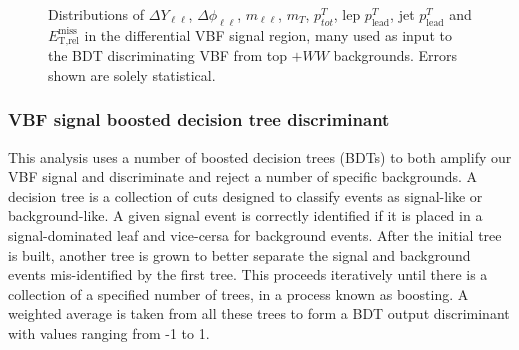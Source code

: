 \begin{figure}[!h]
{  }\hfill
  \hfill
{\caption{Distributions of $\Delta Y_{\ell\ell}$, $\Delta \phi_{\ell\ell}$, $m_{\ell\ell}$, $m_T$, $p^T_{tot}$, lep $p^T_{\text{lead}}$, jet $p^T_{\text{lead}}$ and $\ensuremath{E_{\text{T,rel}}^{\text{miss}}}$ in the differential VBF signal region, many used as input to the BDT discriminating VBF from top $+WW$ backgrounds. Errors shown are solely statistical.
\label{fig:signalregion}}}
\end{figure}

\subsubsection{VBF signal boosted decision tree discriminant}
This analysis uses a number of boosted decision trees (BDTs) to both amplify our VBF signal and discriminate and reject a number of specific backgrounds. A decision tree is a collection of cuts designed to classify events as signal-like or background-like. A given signal event is correctly identified if it is placed in a signal-dominated leaf and vice-cersa for background events. After the initial tree is built, another tree is grown to better separate the signal and background events mis-identified by the first tree. This proceeds iteratively until there is a collection of a specified number of trees, in a process known as boosting. A weighted average is taken from all these trees to form a BDT output discriminant with values ranging from -1 to 1.

